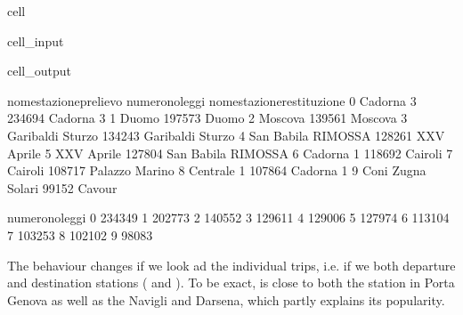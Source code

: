 \documentclass[letterpaper,10pt,english]{jupyterBook}
\begin{document}
\begin{sphinxuseclass}{cell}
\begin{sphinxuseclass}{cell_input}
\begin{sphinxVerbatim}[commandchars=\\\{\}]
\PYG{p}{[} \PYG{p}{]}  
\end{sphinxVerbatim}

\end{sphinxuseclass}
\begin{sphinxuseclass}{cell_output}
\begin{sphinxVerbatim}[commandchars=\\\{\}]
  nome\PYGZus{}stazione\PYGZus{}prelievo  numero\PYGZus{}noleggi nome\PYGZus{}stazione\PYGZus{}restituzione  \PYGZbs{}
0              Cadorna 3          234694                  Cadorna 3   
1                  Duomo          197573                      Duomo   
2                Moscova          139561                    Moscova   
3     Garibaldi \PYGZhy{} Sturzo          134243         Garibaldi \PYGZhy{} Sturzo   
4  San Babila \PYGZhy{} RIMOSSA\PYGZhy{}          128261                 XXV Aprile   
5             XXV Aprile          127804      San Babila \PYGZhy{} RIMOSSA\PYGZhy{}   
6              Cadorna 1          118692                    Cairoli   
7                Cairoli          108717             Palazzo Marino   
8             Centrale 1          107864                  Cadorna 1   
9      Coni Zugna Solari           99152                     Cavour   

   numero\PYGZus{}noleggi  
0          234349  
1          202773  
2          140552  
3          129611  
4          129006  
5          127974  
6          113104  
7          103253  
8          102102  
9           98083  
\end{sphinxVerbatim}

\end{sphinxuseclass}
\end{sphinxuseclass}
\sphinxAtStartPar
The behaviour changes if we look ad the individual trips, i.e. if we  both departure and destination stations ( and ). To be exact,  is close to both the station in Porta Genova as well as the Navigli and Darsena, which partly explains its popularity.
\end{document}
